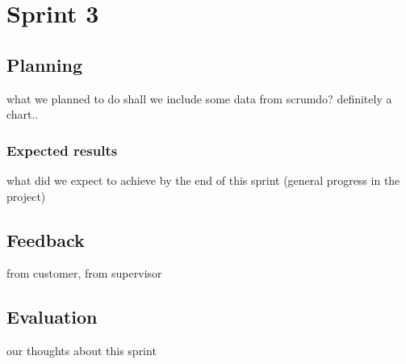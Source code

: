 
\chapter{Sprint 3} %

\label{Sprint 3} %


\section{Planning}
what we planned to do
shall we include some data from scrumdo? definitely a chart..
\subsection{Expected results}
what did we expect to achieve by the end of this sprint (general progress in the project)
\section{Feedback}
from customer, from supervisor
\section{Evaluation}
our thoughts about this sprint